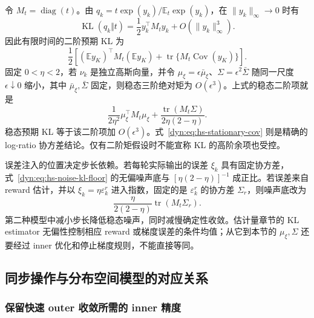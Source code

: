 \documentclass[lang=cn,scheme=chinese,openany]{../book/elegantbook}
\newcommand{\E}{\mathbb E}
\newcommand{\KL}{\operatorname{KL}}
\begin{document}
令 $M_t=\operatorname{diag}(t)$。由 $q_k=t\exp(y_k)/\E_t\exp(y_k)$，在 $\|y_k\|_\infty\to0$ 时有
\begin{equation*}
 \KL(q_k\Vert t)=\frac12 y_k^\top M_t y_k
                   +O(\|y_k\|_\infty^3).
\end{equation*}
因此有限时间的二阶预期 KL 为
\begin{equation*}
 \frac12\left[(\E y_K)^\top M_t(\E y_K)
             +\operatorname{tr}\{M_t\operatorname{Cov}(y_K)\}\right].
\end{equation*}
固定 $0<\eta<2$，若 $\nu_k$ 是独立高斯向量，并令 $\mu_\xi=\epsilon\bar\mu_\xi$、$\Sigma=\epsilon^2\bar\Sigma$ 随同一尺度 $\epsilon\downarrow0$ 缩小，其中 $\bar\mu_\xi,\bar\Sigma$ 固定，则稳态三阶绝对矩为 $O(\epsilon^3)$。上式的稳态二阶项就是
\begin{equation}\label{dyn:eq:hs-noise-kl-floor}
 \frac{1}{2\eta^2}\mu_\xi^\top M_t\mu_\xi
 +\frac{\operatorname{tr}(M_t\Sigma)}{2\eta(2-\eta)}.
\end{equation}
稳态预期 KL 等于该二阶项加 $O(\epsilon^3)$。式~\eqref{dyn:eq:hs-stationary-cov} 则是精确的 log-ratio 协方差结论。仅有二阶矩假设时不能宣称 KL 的高阶余项也受控。

误差注入的位置决定步长依赖。若每轮实际输出的误差 $\xi_k$ 具有固定协方差，式~\eqref{dyn:eq:hs-noise-kl-floor} 的无偏噪声底与 $[\eta(2-\eta)]^{-1}$ 成正比。若误差来自 reward 估计，并以 $\xi_k=\eta\varepsilon_k^{r}$ 进入指数，固定的是 $\varepsilon_k^{r}$ 的协方差 $\Sigma_r$，则噪声底改为
\begin{equation*}
 \frac{\eta}{2(2-\eta)}\operatorname{tr}(M_t\Sigma_r).
\end{equation*}
第二种模型中减小步长降低稳态噪声，同时减慢确定性收敛。估计量章节的 KL estimator 无偏性控制相应 reward 或梯度误差的条件均值；从它到本节的 $\mu_\xi,\Sigma$ 还要经过 inner 优化和停止梯度规则，不能直接等同。

\subsection{同步操作与分布空间模型的对应关系}

\subsubsection{保留快速 outer 收敛所需的 inner 精度}
\end{document}
